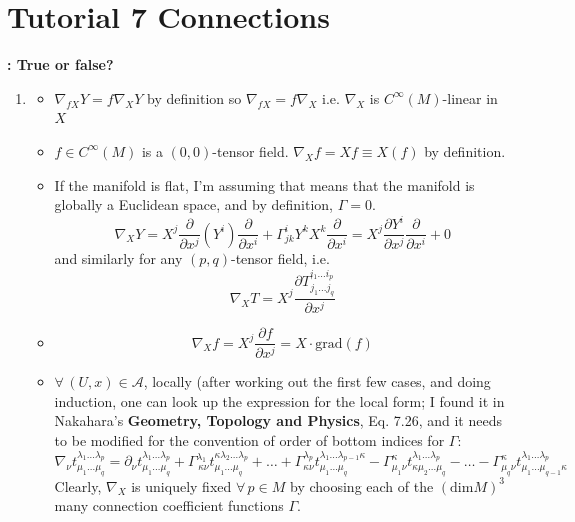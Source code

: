 \section*{Tutorial 7 Connections}

\textbf{: True or false?}

\begin{enumerate}
\item[(a)] 
\begin{itemize}
\item $\nabla_{fX}Y = f\nabla_XY$ by definition so $\nabla_{fX} = f\nabla_X$ i.e. $\nabla_X$ is $C^{\infty}(M)$-linear in $X$
\item $f\in C^{\infty}(M)$ is a $(0,0)$-tensor field. $\nabla_Xf = Xf \equiv X(f)$ by definition.
\item If the manifold is flat, I'm assuming that means that the manifold is globally a Euclidean space, and by definition, $\Gamma=0$.
\[
\nabla_X Y = X^j \frac{ \partial }{ \partial x^j} (Y^i) \frac{ \partial }{ \partial x^i } + \Gamma^i_{jk} Y^k X^k \frac{ \partial }{ \partial x^i} = X^j \frac{ \partial Y^i}{ \partial x^j} \frac{ \partial }{ \partial x^i} + 0
\]
and similarly for any $(p,q)$-tensor field, i.e.
\[
\nabla_X T = X^j \frac{ \partial T^{i_1 \dots i_p}_{ j_1 \dots j_q} }{ \partial x^j}
\]
\item \[
\nabla_X f = X^j \frac{ \partial f}{ \partial x^j} = X\cdot \text{grad}(f)
\]
\item $\forall \, (U,x) \in \mathcal{A}$, locally (after working out the first few cases, and doing induction, one can look up the expression for the local form; I found it in Nakahara's \textbf{Geometry, Topology and Physics}, Eq. 7.26, and it needs to be modified for the convention of order of bottom indices for $\Gamma$:
\[
\nabla_{\nu} t^{\lambda_1 \dots \lambda_p }_{ \mu_1 \dots \mu_q} = \partial_{\nu} t^{\lambda_1 \dots \lambda_p}_{ \mu_1 \dots \mu_q} + \Gamma^{\lambda_1}_{ \,  \kappa \nu } t^{\kappa \lambda_2 \dots \lambda_p }_{\mu_1 \dots \mu_q} + \dots + \Gamma^{\lambda_p}_{ \kappa \nu } t^{\lambda_1 \dots \lambda_{p-1} \kappa }_{ \mu_1 \dots \mu_q} - \Gamma^{\kappa}_{  \mu_1 \nu} t^{\lambda_1 \dots \lambda_p }_{ \kappa \mu_2 \dots \mu_q} - \dots - \Gamma^{\kappa}_{  \mu_q \nu} t^{\lambda_1 \dots \lambda_p }_{\mu_1 \dots \mu_{q-1} \kappa }
\]
Clearly, $\nabla_X$ is uniquely fixed $\forall \, p \in M$ by choosing each of the $(\text{dim}M)^3$ many connection coefficient functions $\Gamma$. 
\end{itemize}

\end{enumerate}
